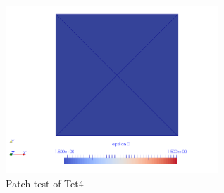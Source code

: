 \begin{figure}
	\begin{center}
		\includegraphics[width=8cm,clip]{Tet4Patch.pdf} 			
		\caption{Patch test of Tet4} \label{fig: Tet4Patch}
	\end{center}
\end{figure}

